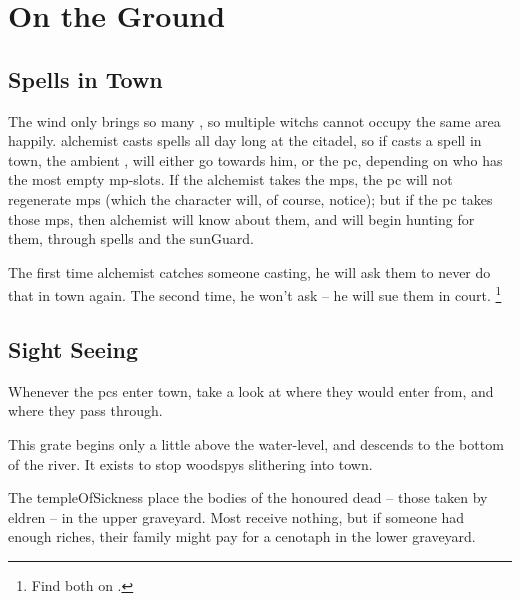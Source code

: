 \section{On the Ground}

\townMap

\begin{multicols}{2}

\subsection{Spells in Town}

The wind only brings so many , so multiple \glspl{witch} cannot occupy the same area happily.
\Gls{alchemist} casts spells all day long at the citadel, so if  casts a spell in town, the ambient , will either go towards him, or the \gls{pc}, depending on who has the most empty \gls{mp}-slots.
If the \gls{alchemist} takes the \glspl{mp}, the \gls{pc} will not regenerate \glspl{mp} (which the character will, of course, notice); but if the \gls{pc} takes those \glspl{mp}, then \gls{alchemist} will know about them, and will begin hunting for them, through spells and the \gls{sunGuard}.

The first time \gls{alchemist} catches someone \gls{casting}, he will ask them to never do that in town again.
The second time, he won't ask -- he will sue them in \gls{court}.%
\footnote{Find both on .}

\subsection{Sight Seeing}

Whenever the \glspl{pc} enter \gls{town}, take a look at where they would enter from, and where they pass through.


This grate begins only a little above the water-level, and descends to the bottom of the river.
It exists to stop \glspl{woodspy}%
slithering into \gls{town}.


The \gls{templeOfSickness} place the bodies of the honoured dead -- those taken by \gls{eldren} -- in the upper graveyard.
Most receive nothing, but if someone had enough riches, their family might pay for a cenotaph in the lower graveyard.



\end{multicols}
